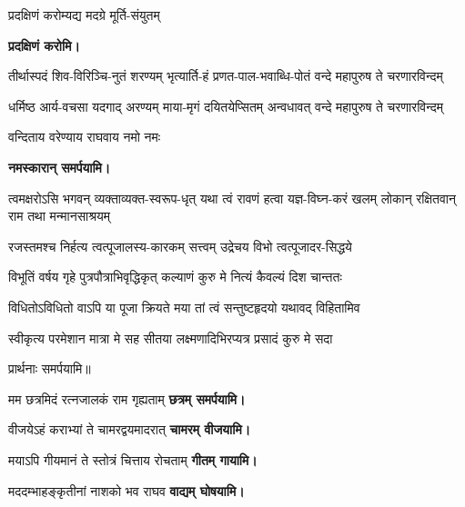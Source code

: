 \begin{center}
{प्रदक्षिणं करोम्यद्य मदग्रे मूर्ति-संयुतम्}

\textbf{\devAya{} प्रदक्षिणं करोमि।}

{तीर्थास्पदं शिव-विरिञ्चि-नुतं शरण्यम्}
{भृत्यार्ति-हं प्रणत-पाल-भवाब्धि-पोतं}
{वन्दे महापुरुष ते चरणारविन्दम्}

{धर्मिष्ठ आर्य-वचसा यदगाद् अरण्यम्}
{माया-मृगं दयितयेप्सितम् अन्वधावत्}
{वन्दे महापुरुष ते चरणारविन्दम्}

{वन्दिताय वरेण्याय राघवाय नमो नमः } 

\textbf{\devAya{} नमस्कारान् समर्पयामि।}

\resetShloka
\threelineshloka
{त्वमक्षरोऽसि भगवन् व्यक्ताव्यक्त-स्वरूप-धृत्}
{यथा त्वं रावणं हत्वा यज्ञ-विघ्न-करं खलम्}
{लोकान् रक्षितवान् राम तथा मन्मानसाश्रयम्}

\twolineshloka
{रजस्तमश्च निर्हत्य त्वत्पूजालस्य-कारकम्}
{सत्त्वम् उद्रेचय विभो त्वत्पूजादर-सिद्धये}

\twolineshloka
{विभूतिं वर्षय गृहे पुत्रपौत्राभिवृद्धिकृत्}
{कल्याणं कुरु मे नित्यं कैवल्यं दिश चान्ततः}

\twolineshloka
{विधितोऽविधितो वाऽपि या पूजा क्रियते मया}
{तां त्वं सन्तुष्टहृदयो यथावद् विहितामिव}

\twolineshloka
{स्वीकृत्य परमेशान मात्रा मे सह सीतया}
{लक्ष्मणादिभिरप्यत्र प्रसादं कुरु मे सदा}

प्रार्थनाः समर्पयामि॥

\begin{center}

\end{center}

{मम छत्रमिदं रत्नजालकं राम गृह्यताम्}
\textbf{\hfill छत्रम् समर्पयामि।}


{वीजयेऽहं कराभ्यां ते चामरद्वयमादरात्}
\textbf{\hfill चामरम् वीजयामि।}


{मयाऽपि गीयमानं ते स्तोत्रं चित्ताय रोचताम्}
\textbf{\hfill गीतम् गायामि।}


{मददम्भाहङ्कृतीनां नाशको भव राघव}
\textbf{\hfill वाद्यम् घोषयामि।}



\end{center}
